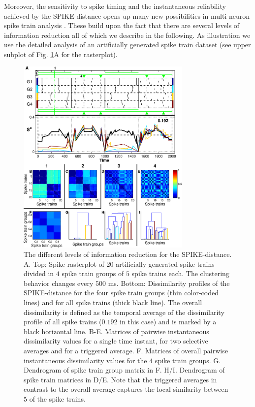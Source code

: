 \documentclass[10pt,twocolumn]{elsart5p}
\begin{document}
Moreover, the sensitivity to spike timing and the instantaneous reliability achieved by the SPIKE-distance opens up many new possibilities in multi-neuron spike train analysis \citep{Kreuz13}. These build upon the fact that there are several levels of information reduction all of which we describe in the following. As illustration we use the detailed analysis of an artificially generated spike train dataset (see upper subplot of Fig. \ref{fig:Fig2-SPIKE-Representations}A for the rasterplot). 
%
%
\begin{figure}
    \includegraphics[width=85mm]{Fig2_SPIKE_Representations.eps}
    \caption{\abb\label{fig:Fig2-SPIKE-Representations} The different levels of information reduction for the SPIKE-distance.  A. Top: Spike rasterplot of $20$ artificially generated spike trains divided in $4$ spike train groups of $5$ spike trains each. The clustering behavior changes every $500$ ms. Bottom: Dissimilarity profiles of the SPIKE-distance for the four spike train groups (thin color-coded lines) and for all spike trains (thick black line). The overall dissimilarity is defined as the temporal average of the dissimilarity profile of all spike trains ($0.192$ in this case) and is marked by a black horizontal line.  B-E. Matrices of pairwise instantaneous dissimilarity values for a single time instant, for two selective averages and for a triggered average.  F. Matrices of overall pairwise instantaneous dissimilarity values for the $4$ spike train groups.  G. Dendrogram of spike train group matrix in F.  H/I. Dendrogram of spike train matrices in D/E. Note that the triggered averages in contrast to the overall average captures the local similarity between $5$ of the spike trains.}
\end{figure}
\end{document}
